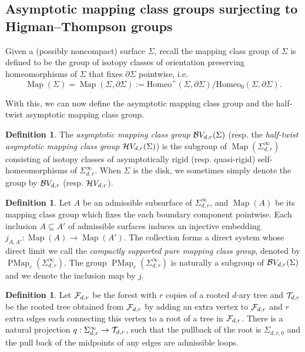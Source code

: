 \documentclass[11pt, a4paper]{amsart}
\theoremstyle{definition}
\newtheorem{defn}[thm]{Definition} %
\DeclareMathOperator{\Map}{Map}
\DeclareMathOperator{\PMap}{PMap}
\begin{document}
\subsection{Asymptotic mapping class groups surjecting to Higman--Thompson groups} Given a (possibly noncompact) surface $\Sigma$, recall the mapping class group of $\Sigma$ is defined to be  the group of isotopy classes of orientation preserving homeomorphisms of $\Sigma$ that fixes $\partial \Sigma$ pointwise, i.e.
$$\Map(\Sigma) = \Map(\Sigma,\partial \Sigma) := \text{Homeo}^+(\Sigma, \partial \Sigma)/ \text{Homeo}_0(\Sigma, \partial \Sigma).$$



With this, we can now define the asymptotic mapping class group and the half-twist asymptotic mapping class group.


\begin{defn}\label{groupB}
The \emph{asymptotic mapping class group} ${\mathcal {B}} V_{d,r}(\Sigma)$ (resp. the \emph{half-twist asymptotic mapping class group} ${\mathcal {H}} V_{d,r}(\Sigma)$) is the subgroup of $\Map(\Sigma_{d,r}^\infty)$ consisting of isotopy classes of asymptotically
rigid (resp. quasi-rigid) self-homeomorphisms of  $\Sigma^{\infty}_{d,r}$. When $\Sigma$ is the disk, we sometimes simply denote the group by ${\mathcal {B}} V_{d,r}$ (resp. ${\mathcal {H}} V_{d,r}$). 
\end{defn}






\begin{defn}
Let $A$ be an admissible subsurface of $\Sigma_{d,r}^\infty$, and $\Map(A)$ be its mapping class group which fixes the each boundary component pointwise. Each inclusion  $A\subseteq A'$ of admissible surfaces induces an injective embedding $j_{A,A'} : \Map(A) \to \Map(A')$. The collection forms a direct system whose direct limit we call the \emph{compactly supported pure mapping class group}, denoted by $\PMap_c(\Sigma_{d,r}^\infty)$. The group $\PMap_c(\Sigma_{d,r}^\infty)$ is naturally a subgroup of ${\mathcal {B}} V_{d,r}(\Sigma)$ and we denote the inclusion map by $j$.
\end{defn}



\begin{defn}\label{defn-forest}
Let ${{\mathcal {F}}}_{d,r}$ be the forest with $r$ copies of a rooted $d$-ary tree and ${\mathcal {T}}_{d,r}$ be the rooted tree obtained from ${{\mathcal {F}}}_{d,r}$ by adding an extra vertex to ${{\mathcal {F}}}_{d,r}$ and $r$ extra edges each connecting this vertex to a root of a tree in ${{\mathcal {F}}}_{d,r}$.   There is a natural projection
$q:\Sigma^{\infty}_{d,r} \to {{\mathcal {T}}_{d,r}}$, such that the pullback of the root is $\Sigma_{d,r,0}$ and the pull back of the midpoints of any edges are admissible loops.
\end{defn}
\end{document}
